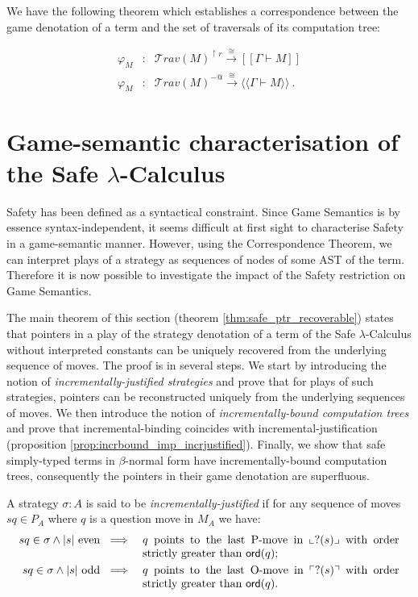 \documentclass{llncs}
\newcommand\travset{\mathcal{T}rav}
\newcommand\ord[1]{{\sf ord}(#1)}
\newcommand{\lsem}{[\![} %
\newcommand{\rsem}{]\!]} %
\newcommand{\sem}[1]{{\lsem #1 \rsem}}
\newcommand{\intersem}[1]{{\langle\!\langle #1 \rangle\!\rangle}}
\newcommand{\oview}[1]{\llcorner #1 \lrcorner}
\newcommand{\pview}[1]{\ulcorner #1 \urcorner}
\begin{document}
We have the following theorem which establishes a correspondence between the game denotation of a
term and the set of traversals of its computation tree:
\begin{theorem}
\label{thm:correspondence}
\begin{eqnarray*}
 \varphi_M  &:& \travset(M)^{\upharpoonright r} \stackrel{\cong}{\longrightarrow} \sem{\Gamma \vdash M} \\
 \varphi_M  &:& \travset(M)^{-@} \stackrel{\cong}{\longrightarrow} \intersem{\Gamma \vdash M} \ .
\end{eqnarray*}
\end{theorem}

\section{Game-semantic characterisation of the Safe $\lambda$-Calculus}

Safety has been defined as a syntactical constraint. Since Game
Semantics is by essence syntax-independent, it seems difficult at
first sight to characterise Safety in a game-semantic manner.
However, using the Correspondence Theorem, we can interpret plays
of a strategy as sequences of nodes of some AST of the term.
Therefore it is now possible to investigate the impact of the Safety
restriction on Game Semantics.

The main theorem of this section (theorem
\ref{thm:safe_ptr_recoverable}) states that pointers in a play of
the strategy denotation of a term of the Safe $\lambda$-Calculus without interpreted
constants can be uniquely recovered
from the underlying sequence of moves. The proof is in several
steps. We start by introducing the notion of
\emph{incrementally-justified strategies} and prove that for plays
of such strategies, pointers can be reconstructed uniquely from the
underlying sequences of moves. We then introduce the notion of
\emph{incrementally-bound computation trees} and prove that
incremental-binding coincides with incremental-justification
(proposition \ref{prop:incrbound_imp_incrjustified}). Finally, we
show that safe simply-typed terms in $\beta$-normal form have
incrementally-bound computation trees, consequently the pointers in
their game denotation are superfluous.


\begin{definition}
A strategy $\sigma : A$ is said to be \emph{incrementally-justified}
if for any sequence of moves $s q \in P_A$ where $q$ is a question
move in $M_A$ we have:
\begin{eqnarray*}
s q \in \sigma \wedge |s| \mbox{ even } &\implies& \parbox[t]{8cm}{$q$ points to the last P-move in $\oview{?(s)}$ with order strictly greater than $\ord{q}$;} \\
s q \in \sigma \wedge |s| \mbox{ odd } &\implies&
\parbox[t]{8cm}{$q$  points to the last O-move in $\pview{?(s)}$
with order strictly greater than $\ord{q}$.}
\end{eqnarray*}
\end{definition}
\end{document}
